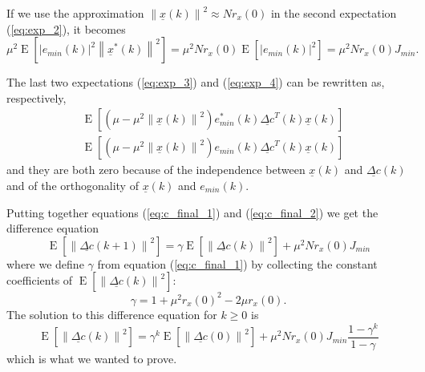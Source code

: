 \documentclass[a4paper,twoside]{article}
\renewcommand{\vec}[1]{\underline{#1}}
\newcommand{\E}[1]{\operatorname{E}\left[#1\right]}
\newcommand{\norm}[1]{\left\lVert#1\right\rVert}
\newcommand{\abs}[1]{\left|#1\right|}
\begin{document}
If we use the approximation $\norm{\vec{x}(k)}^2 \approx Nr_x(0)$ in
the second expectation (\ref{eq:exp_2}), it becomes
\begin{equation}
\mu^2 \E{\abs{e_{min}(k)}^2 \norm{\vec{x}^*(k)}^2}
= \mu^2Nr_x(0)\E{\abs{e_{min}(k)}^2}
= \mu^2Nr_x(0)J_{min} .
\label{eq:c_final_2}
\end{equation}

The last two expectations (\ref{eq:exp_3}) and (\ref{eq:exp_4}) can be
rewritten as, respectively,
\begin{align*}
  & \E{\left(\mu - \mu^2\norm{\vec{x}(k)}^2\right) e_{min}^*(k) \vec{\Delta c}^T(k)\vec{x}(k)} \\
  & \E{\left(\mu - \mu^2\norm{\vec{x}(k)}^2\right) e_{min}(k) \vec{\Delta c}^T(k)\vec{x}(k)}
\end{align*}
and they are both zero because of the independence between $\vec{x}(k)$
and $\vec{\Delta c}(k)$ and of the orthogonality of $\vec{x}(k)$ and
$e_{min}(k)$.

Putting together equations (\ref{eq:c_final_1}) and
(\ref{eq:c_final_2}) we get the difference equation
\begin{equation}
  \E{\norm{\vec{\Delta c}(k+1)}^2} = \gamma \E{\norm{\vec{\Delta
        c}(k)}^2} + \mu^2Nr_x(0)J_{min}
\end{equation}
where we define $\gamma$ from equation (\ref{eq:c_final_1}) by
collecting the constant coefficients of $\E{\norm{\vec{\Delta c}(k)}^2}$:
\[ \gamma = 1 + \mu^2r_x(0)^2 - 2\mu r_x(0) . \]
The solution to this difference equation for $k \geq 0$ is
\begin{equation}
  \E{\norm{\vec{\Delta c}(k)}^2} =
  \gamma^k \E{\norm{\vec{\Delta c}(0)}^2} +
  \mu^2Nr_x(0)J_{min} \frac{1 - \gamma^k}{1 - \gamma}
\end{equation}
which is what we wanted to prove.
\end{document}
